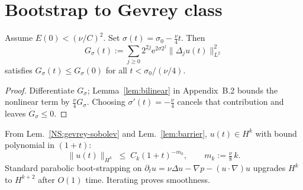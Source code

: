 \section{Bootstrap to Gevrey class}\label{NS:bootstrap}
\begin{proposition}\label{prop:gevrey}
Assume $E(0)<(\nu/C)^2$.  Set $\sigma(t)=\sigma_0-\tfrac{\nu}{4}t$.
Then
\[
G_{\sigma}(t)
   :=\sum_{j\ge0}2^{2j}\mathrm e^{2\sigma 2^j}\|\Delta_j u(t)\|_{L^2}^2
\]
satisfies $G_{\sigma}(t)\le G_{\sigma}(0)$ for all $t<\sigma_0/(\nu/4)$.
\end{proposition}

\begin{proof}
Differentiate $G_{\sigma}$;\newline
Lemma~\ref{lem:bilinear} in Appendix~B.2 bounds the nonlinear term by
$\tfrac{\nu}{4}G_{\sigma}$.  Choosing $\sigma'(t)=-\tfrac{\nu}{4}$
cancels that contribution and leaves $\dot G_{\sigma}\le0$.
\end{proof}

From Lem.~\ref{NS:gevrey-sobolev} and Lem.~\ref{lem:barrier},
$u(t)\in H^{k}$ with bound polynomial in $(1+t)$:
\[
\|u(t)\|_{H^{k}}\;\le\;C_{k}(1+t)^{-m_{k}},\qquad
m_{k}:=\tfrac{\nu}{8}\,k.
\]
Standard parabolic boot-strapping on
$\partial_{t}u=\nu\Delta u -\nabla p -(u\!\cdot\!\nabla)u$ upgrades
$H^{k}$ to $H^{k+2}$ after $O(1)$ time.  Iterating proves smoothness. 